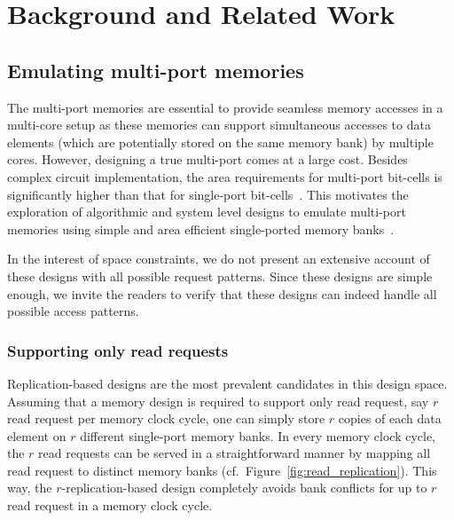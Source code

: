 \section{Background and Related Work}
\label{sec:bg}

\subsection{Emulating multi-port memories}
\label{sec:emulation}

The multi-port memories are essential to provide seamless memory accesses in a multi-core setup as these memories can support simultaneous accesses to data elements (which are potentially stored on the same memory bank) by multiple cores. However, designing a true multi-port comes at a large cost. Besides complex circuit implementation, the area requirements for multi-port bit-cells is significantly higher than that for single-port bit-cells~\cite{Suzuki,WLCH14}. This motivates the exploration of algorithmic and system level designs to emulate multi-port memories using simple and area efficient single-ported memory banks~\cite{ACP88, EMY91, RG91,Memoir_xor, Memoir_xor_virtual}.


{\color{red} In the interest of space constraints, we do not present an extensive account of these designs with all possible request patterns. Since these designs are simple enough, we invite the readers to verify that these designs can indeed handle all possible access patterns.}


\subsubsection{Supporting only read requests} 
\label{sec:read_only}
Replication-based designs are the most prevalent candidates in this design space. Assuming that a memory design is required to support only read request, say $r$ read request per memory clock cycle, one can simply store $r$ copies of each data element on $r$ different single-port memory banks. In every memory clock cycle, the $r$ read requests can be served in a straightforward manner by mapping all read request to distinct memory banks (cf.~Figure~\ref{fig:read_replication}). This way, the $r$-replication-based design completely avoids bank conflicts for up to $r$ read request in a memory clock cycle. 

